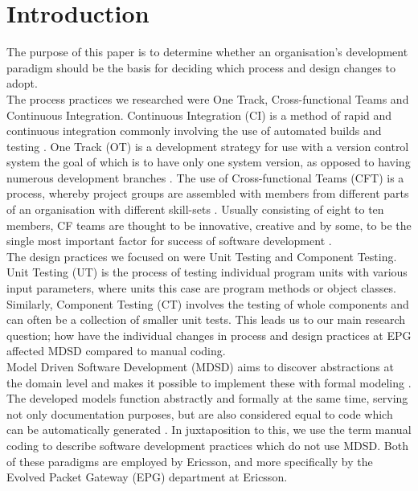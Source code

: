 \documentclass[fina_report_innit.tex]{subfiles}
\begin{document}
\section{Introduction}

The purpose of this paper is to determine whether an organisation's development paradigm should be the basis for deciding which process and design changes to adopt. 
\\

The process practices we researched were One Track, Cross-functional Teams and Continuous Integration. Continuous Integration (CI) is a method of rapid and continuous integration commonly involving the use of automated builds and testing \cite{sommerville10software}. One Track (OT) is a development strategy for use with a version control system the goal of which is to have only one system version, as opposed to having numerous development branches \cite{hribar2008first}. The use of Cross-functional Teams (CFT) is a process, whereby project groups are assembled with members from different parts of an organisation with different skill-sets \cite{henke1993perspective}\cite{ghobadi2011challenges}. Usually consisting of eight to ten members, CF teams are thought to be innovative, creative \cite{ghobadi2011challenges} and by some, to be the single most important factor for success of software development \cite{marchwinski2000technical}.
\\

The design practices we focused on were Unit Testing and Component Testing. Unit Testing (UT) is the process of testing individual program units with various input parameters, where units this case are program methods or object classes. Similarly, Component Testing (CT) involves the testing of whole components and can often be a collection of smaller unit tests. This leads us to our main research question; how have the individual changes in process and design practices at EPG affected MDSD compared to manual coding.
\\

Model Driven Software Development (MDSD) aims to discover abstractions at the domain level and makes it possible to implement these with formal modeling \cite{stahl2006model}. The developed models function abstractly and formally at the same time, serving not only documentation purposes, but are also considered equal to code which can be automatically generated \cite{stahl2006model}. In juxtaposition to this, we use the term manual coding to describe software development practices which do not use MDSD. Both of these paradigms are employed by Ericsson, and more specifically by the Evolved Packet Gateway (EPG) department at Ericsson.
\\
\end{document}
